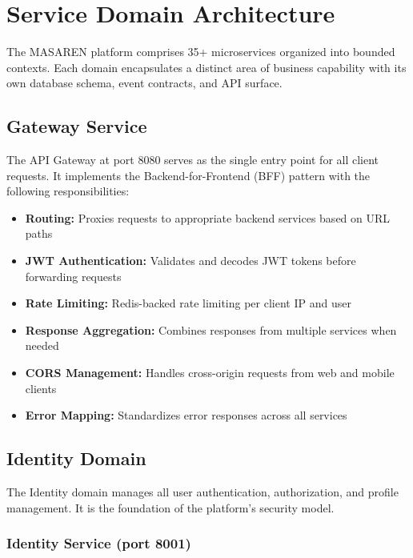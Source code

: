 
\section{Service Domain Architecture}

The MASAREN platform comprises 35+ microservices organized into bounded contexts. Each domain encapsulates a distinct area of business capability with its own database schema, event contracts, and API surface.

\subsection{Gateway Service}

The API Gateway at port 8080 serves as the single entry point for all client requests. It implements the Backend-for-Frontend (BFF) pattern with the following responsibilities:

\begin{itemize}
  \item \textbf{Routing:} Proxies requests to appropriate backend services based on URL paths
  \item \textbf{JWT Authentication:} Validates and decodes JWT tokens before forwarding requests
  \item \textbf{Rate Limiting:} Redis-backed rate limiting per client IP and user
  \item \textbf{Response Aggregation:} Combines responses from multiple services when needed
  \item \textbf{CORS Management:} Handles cross-origin requests from web and mobile clients
  \item \textbf{Error Mapping:} Standardizes error responses across all services
\end{itemize}

\subsection{Identity Domain}

The Identity domain manages all user authentication, authorization, and profile management. It is the foundation of the platform's security model.

\subsubsection{Identity Service (port 8001)}

